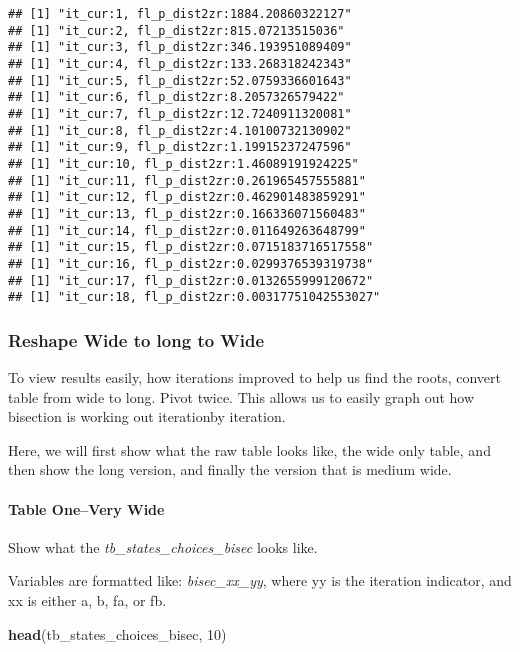 \documentclass[
]{book}
\newenvironment{Shaded}{\begin{snugshade}}{\end{snugshade}}
\newcommand{\DecValTok}[1]{\textcolor[rgb]{0.00,0.00,0.81}{#1}}
\newcommand{\KeywordTok}[1]{\textcolor[rgb]{0.13,0.29,0.53}{\textbf{#1}}}
\newcommand{\NormalTok}[1]{#1}
\begin{document}
\begin{verbatim}
## [1] "it_cur:1, fl_p_dist2zr:1884.20860322127"
## [1] "it_cur:2, fl_p_dist2zr:815.07213515036"
## [1] "it_cur:3, fl_p_dist2zr:346.193951089409"
## [1] "it_cur:4, fl_p_dist2zr:133.268318242343"
## [1] "it_cur:5, fl_p_dist2zr:52.0759336601643"
## [1] "it_cur:6, fl_p_dist2zr:8.2057326579422"
## [1] "it_cur:7, fl_p_dist2zr:12.7240911320081"
## [1] "it_cur:8, fl_p_dist2zr:4.10100732130902"
## [1] "it_cur:9, fl_p_dist2zr:1.19915237247596"
## [1] "it_cur:10, fl_p_dist2zr:1.46089191924225"
## [1] "it_cur:11, fl_p_dist2zr:0.261965457555881"
## [1] "it_cur:12, fl_p_dist2zr:0.462901483859291"
## [1] "it_cur:13, fl_p_dist2zr:0.166336071560483"
## [1] "it_cur:14, fl_p_dist2zr:0.011649263648799"
## [1] "it_cur:15, fl_p_dist2zr:0.0715183716517558"
## [1] "it_cur:16, fl_p_dist2zr:0.0299376539319738"
## [1] "it_cur:17, fl_p_dist2zr:0.0132655999120672"
## [1] "it_cur:18, fl_p_dist2zr:0.00317751042553027"
\end{verbatim}

\hypertarget{reshape-wide-to-long-to-wide}{%
\subsubsection{Reshape Wide to long to Wide}\label{reshape-wide-to-long-to-wide}}

To view results easily, how iterations improved to help us find the roots, convert table from wide to long. Pivot twice. This allows us to easily graph out how bisection is working out iterationby iteration.

Here, we will first show what the raw table looks like, the wide only table, and then show the long version, and finally the version that is medium wide.

\hypertarget{table-onevery-wide}{%
\paragraph{Table One--Very Wide}\label{table-onevery-wide}}

Show what the \emph{tb\_states\_choices\_bisec} looks like.

Variables are formatted like: \emph{bisec\_xx\_yy}, where yy is the iteration indicator, and xx is either a, b, fa, or fb.

\begin{Shaded}
\begin{Highlighting}[]
\KeywordTok{head}\NormalTok{(tb_states_choices_bisec, }\DecValTok{10}\NormalTok{)}
\end{Highlighting}
\end{Shaded}
\end{document}
